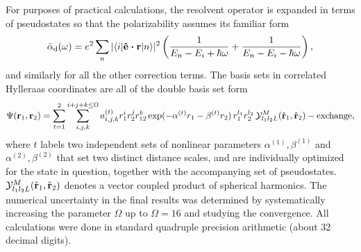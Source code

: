 \documentclass[%
 amsmath,amssymb,
aps,
]{revtex4-2}
\def\edotr{\mbox{\boldmath{$\hat{\bf e}\cdot {\bf r}$}}}
\begin{document}
For purposes of practical calculations, the resolvent operator is expanded in terms of pseudostates so that the polarizability assumes its familiar form
\begin{equation}
\bar{\alpha}_{\rm d}(\omega) = e^2\sum_n |\langle i|\edotr |n\rangle|^2\left(\frac{1}{E_n-E_i+\hbar\omega} +
\frac{1}{E_n-E_i-\hbar\omega}\right),
\end{equation}
and similarly for all the other correction terms.  The basis sets in correlated Hylleraas coordinates are all of the double basis set form \cite{Drake88,Drake92}
\begin{equation}
\Psi({\bf r}_1,{\bf r}_2) = \sum_{t=1}^2\sum_{i,j,k}^{i+j+k\le\Omega}
a_{i,j,k}^{(t)} r_1^ir_2^jr_{12}^k\exp(-\alpha^{(t)}r_1 - \beta^{(t)}
r_2)\, r_1^{l_1}r_2^{l_2}\, {\cal Y}_{l_1l_2L}^M(\hat{\bf r}_1,\hat{\bf r}_2) - {\rm exchange},
\end{equation}
where $t$ labels two independent sets of nonlinear parameters $\alpha^{(1)}, \beta^{(1)}$ and $\alpha^{(2)}, \beta^{(2)}$ that set two distinct distance scales, and are individually optimized for the state in question, together with the accompanying set of pseudostates.  ${\cal Y}_{l_1l_2L}^M(\hat{\bf r}_1,\hat{\bf r}_2)$ denotes a vector coupled product of spherical harmonics.  The numerical uncertainty in the final results was determined by systematically increasing the parameter $\Omega$ up to $\Omega = 16$ and studying the convergence.  All calculations were done in standard quadruple precision arithmetic (about 32 decimal digits).
\end{document}
